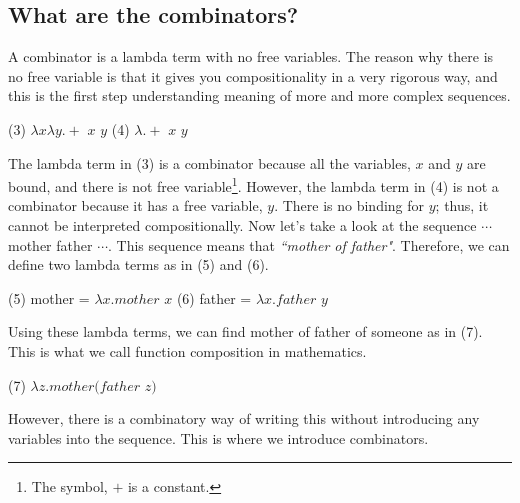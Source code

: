 \documentclass[12pt,a4paper]{article}
\begin{document}
\subsection{What are the combinators?}
A combinator is a lambda term with no free variables. The reason why there is no free variable is that it gives you compositionality in a very rigorous way, and this is the first step understanding meaning of more and more complex sequences.
\begin{center}
(3) $\lambda x\lambda y.+$ $x$ $y$ \hspace{1cm} 
(4) $\lambda.+$ $x$ $y$
\end{center}
The lambda term in (3) is a combinator because all the variables, $x$ and $y$ are bound, and there is not free variable\footnote{The symbol, $+$ is a constant.}. However, the lambda term in (4) is not a combinator because it has a free variable, $y$. There is no binding for $y$; thus, it cannot be interpreted compositionally. Now let's take a look at the sequence $\cdots$ mother father $\cdots$. This sequence means that \emph{``mother of father"}. Therefore, we can define two lambda terms as in (5) and (6).
\begin{center}
(5) mother = $\lambda x.mother$ $x$ \hspace{1cm}
(6) father = $\lambda x.father$ $y$
\end{center}
Using these lambda terms, we can find mother of father of someone as in (7). This is what we call function composition in mathematics.
\begin{center}
(7) $\lambda z.mother(father$ $z)$
\end{center} 
However, there is a combinatory way of writing this without introducing any variables into the sequence. This is where we introduce combinators.
\end{document}
